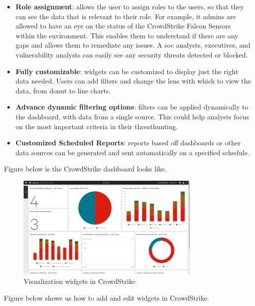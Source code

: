 \begin{itemize}
      \item \textbf{Role assignment}: allows the user to assign roles to the users, so that they can see
            the data that is relevant to their role. For example, \acrshort{it} admins are allowed to have
            an eye on the status of the CrowdStrike Falcon Sensors within the environment. This enables them
            to  understand if there are any gaps and allows them to remediate any issues. A \acrshort{soc}
            analysts, executives, and vulnerability analysts can easily see any security threats detected
            or blocked.
      \item \textbf{Fully customizable}: widgets can be customized to display just the right data needed.
            Users can add filters and change the lens with which to view the data, from donut to line charts.
      \item \textbf{Advance dynamic filtering options}: filters can be applied dynamically to the dashboard,
            with data from a single source. This could help analysts focus on the most important criteria
            in their \gls{threathunting}.
      \item \textbf{Customized Scheduled Reports}: reports based off dashboards or other data sources can
            be generated and sent automatically on a specified schedule.
\end{itemize}

Figure below is the CrowdStrike dashboard looks like.

\begin{figure}[H]
      \centering
      \includegraphics[width=0.8\textwidth]{Figures/CrowdStrike/visualization-widgets.png}
      \caption{Visualization widgets in CrowdStrike}
\end{figure}

Figure below shows us how to add and edit widgets in CrowdStrike.

